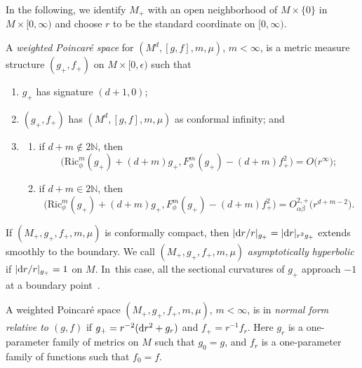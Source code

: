 \documentclass[10pt,a4paper]{amsart}
\newcommand{\psmms}{(M_+,g_+,f_+,m,\mu)}
\numberwithin{equation}{section}
\begin{document}
In the following, we identify $M_+$ with an open neighborhood of $M\times \{0\}$ in $M\times [0,\infty)$ and choose $r$ to be the standard coordinate on $[0,\infty)$.

\begin{Definition}
\label{poincare-definition}
A \emph{weighted Poincar\'e space} for $(M^d,[g,f],m,\mu)$, $m<\infty$, is a metric measure structure $(g_+,f_+)$ on $M\times [0,\epsilon)$ such that
\begin{enumerate}[label=$(\roman*)$]\itemsep=0pt

\item $g_+$ has signature $(d+1,0)$;

\item $(g_+,f_+)$ has $(M^d,[g,f],m,\mu)$ as conformal infinity; and

\item \begin{enumerate}\itemsep=0pt
\item[$(a)$] if $d+m\notin 2\mathbb{N}$, then
\begin{equation*}
\big(\mathrm{Ric}_{\phi}^m(g_+)+(d+m)g_+,F_\phi^m(g_+)
-(d+m)f_+^2\big)=O\big(r^\infty\big);
\end{equation*}

\item[$(b)$] if $d+m\in 2\mathbb{N}$, then
\begin{equation*}
\big(\mathrm{Ric}_{\phi}^m(g_+)+(d+m)g_+,F_\phi^m(g_+)
-(d+m)f_+^2\big)=O^{2,+}_{\alpha\beta}\big(r^{d+m-2}\big).
\end{equation*}
\end{enumerate}
\end{enumerate}
\end{Definition}


If $\psmms$ is conformally compact, then $|{\rm d}r/r|_{g_+}=|{\rm d}r|_{r^2 g_+}$ extends smoothly to the boundary. We call $\psmms$ \emph{asymptotically hyperbolic} if $|{\rm d}r/r|_{g_+}=1$ on $M$. In~this case, all the sectional curvatures of $g_+$ approach $-1$ at a boundary point~\cite{MazzeoMelrose1987}.

\begin{Definition}
A weighted Poincar\'e space $\psmms$, $m<\infty$, is in \emph{normal form relative to $(g,f)$} if $g_+=r^{-2}({\rm d}r^2+g_r)$ and $f_+=r^{-1}f_r$. Here $g_r$ is a one-parameter family of metrics on $M$ such that $g_0=g$, and $f_r$ is a one-parameter family of functions such that $f_0=f$.
\end{Definition}
\end{document}
